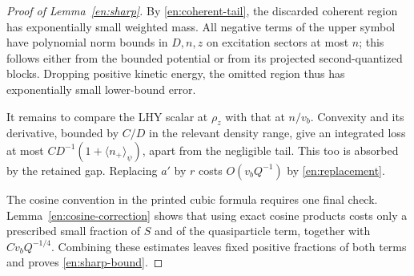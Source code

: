\begin{proof}[Proof of Lemma~\ref{en:sharp}]
By \eqref{en:coherent-tail}, the discarded coherent region has
exponentially small weighted mass.  All negative terms of the upper symbol have
polynomial norm bounds in $D,n,z$ on excitation sectors at most $n$;
this follows either from the bounded potential or from its projected
second-quantized blocks.  Dropping positive kinetic energy, the omitted
region thus has exponentially small lower-bound error.

It remains to compare the LHY scalar at $\rho_z$ with that at $n/v_b$.
Convexity and its derivative, bounded by $C/D$ in the relevant density
range, give an integrated loss at most
$CD^{-1}(1+\langle n_+\rangle_\psi)$, apart from the negligible tail.
This too is absorbed by the retained gap.  Replacing $a'$ by $r$ costs
$O(v_bQ^{-1})$ by \eqref{en:replacement}.

The cosine convention in the printed cubic formula requires one final
check.  Lemma~\ref{en:cosine-correction} shows that using exact
cosine products costs only a prescribed small fraction of $S$ and of
the quasiparticle term, together with $Cv_bQ^{-1/4}$.  Combining these
estimates leaves fixed positive fractions of both terms and proves
\eqref{en:sharp-bound}.
\end{proof}

